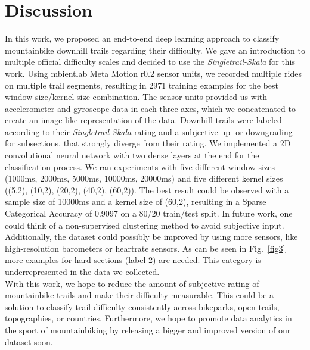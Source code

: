 \documentclass[runningheads]{llncs}
\begin{document}
\section{Discussion}
In this work, we proposed an end-to-end deep learning approach to classify mountainbike downhill trails regarding their difficulty. 
We gave an introduction to multiple official difficulty scales and decided to use the \textit{Singletrail-Skala} for this work.
Using mbientlab Meta Motion r0.2 sensor units, we recorded multiple rides on multiple trail segments, resulting in 2971 training examples for the best window-size/kernel-size combination.
The sensor units provided us with accelerometer and gyroscope data in each three axes, which we concatenated to create an image-like representation of the data.
Downhill trails were labeled according to their \textit{Singletrail-Skala} rating and a subjective up- or downgrading for subsections, that strongly diverge from their rating.
We implemented a 2D convolutional neural network with two dense layers at the end for the classification process.
We ran experiments with five different window sizes (1000ms, 2000ms, 5000ms, 10000ms, 20000ms) and five different kernel sizes ((5,2), (10,2), (20,2), (40,2), (60,2)).
The best result could be observed with a sample size of 10000ms and a kernel size of (60,2), resulting in a Sparse Categorical Accuracy of 0.9097 on a 80/20 train/test split. 
In future work, one could think of a non-supervised clustering method to avoid subjective input.
Additionally, the dataset could possibly be improved by using more sensors, like high-resolution barometers or heartrate sensors.
As can be seen in Fig.~\ref{fig3} more examples for hard sections (label 2) are needed.
This category is underrepresented in the data we collected.
\\
With this work, we hope to reduce the amount of subjective rating of mountainbike trails and make their difficulty measurable.
This could be a solution to classify trail difficulty consistently across bikeparks, open trails, topographies, or countries.
Furthermore, we hope to promote data analytics in the sport of mountainbiking by releasing a bigger and improved version of our dataset soon.




\end{document}
